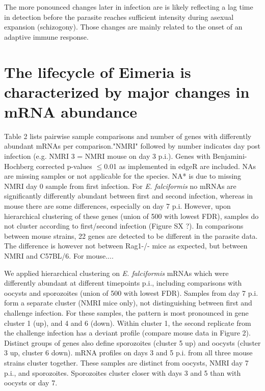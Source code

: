 \documentclass{bmcart}
\begin{document}
The more ponounced changes later in infection are is likely reflecting
a lag time in detection before the parasite reaches sufficient
intensity during asexual expansion (schizogony). Those changes are
mainly related to the onset of an adaptive immune response.







\section*{The lifecycle of Eimeria is characterized by major changes in mRNA abundance}

Table 2 lists pairwise sample comparisons and number of genes with
differently abundant mRNAs per comparison."NMRI" followed by number
indicates day post infection (e.g. NMRI 3 = NMRI mouse on day 3
p.i.). Genes with Benjamini-Hochberg corrected p-values $\leq$0.01 as
implemented in edgeR are included. NAs are missing samples or not
applicable for the species. NA* is due to missing NMRI day 0 sample
from first infection. For \textit{E. falciformis} no mRNAs are
significantly differently abundant between first and second infection,
whereas in mouse there are some differences, especially on day 7
p.i. However, upon hierarchical clustering of these genes (union of
500 with lowest FDR), samples do not cluster according to first/second
infection (Figure SX ?). In comparisons between mouse strains, 22
genes are detected to be different in the parasite data. The
difference is however not between Rag1-/- mice as expected, but
between NMRI and C57BL/6. For mouse....


We applied hierarchical clustering on \textit{E. falciformis} mRNAs
which were differently abundant at different timepoints p.i.,
including comparisons with oocysts and sporozoites (union of 500 with
lowest FDR). Samples from day 7 p.i. form a separate cluster (NMRI
mice only), not distinguishing between first and challenge
infection. For these samples, the pattern is most pronounced in gene
cluster 1 (up), and 4 and 6 (down). Within cluster 1, the second
replicate from the challenge infection has a deviant profile (compare
mouse data in Figure 2). Distinct groups of genes also define
sporozoites (cluster 5 up) and oocysts (cluster 3 up, cluster 6
down). mRNA profiles on days 3 and 5 p.i. from all three mouse strains
cluster together. These samples are distinct from oocysts, NMRI day 7
p.i., and sporozoites. Sporozoites cluster closer with days 3 and 5
than with oocysts or day 7.
\end{document}
